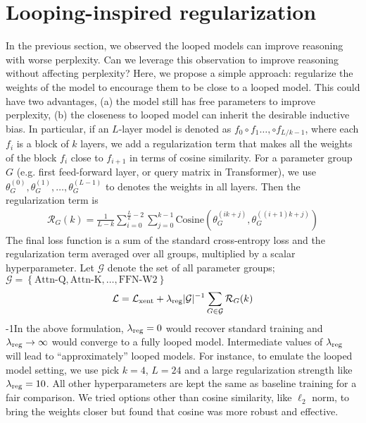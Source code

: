 \section{Looping-inspired regularization}
\label{sec:regularization}

In the previous section, we observed the looped models can improve reasoning with worse perplexity. Can we leverage this observation to improve reasoning without affecting perplexity? Here, we propose a simple approach: regularize the weights of the model to encourage them to be close to a looped model. This could have two advantages, (a) the model still has free parameters to improve perplexity, (b) the closeness to looped model can inherit the desirable inductive bias.
In particular, if an $L$-layer model is denoted as $f_{0}\circ f_{1} \dots, \circ f_{L/k-1}$, where each $f_{i}$ is a block of $k$ layers, we add a regularization term that makes all the weights of the block $f_{i}$ close to $f_{i+1}$ in terms of cosine similarity.
For a parameter group $G$ (e.g. first feed-forward layer, or query matrix in Transformer), we use $\theta_{G}^{(0)}, \theta_{G}^{(1)}, \dots, \theta_{G}^{(L-1)}$ to denotes the weights in all layers.
Then the regularization term is
\begin{align}
    \mathcal{R}_{G}(k) = \frac{1}{L-k}\sum_{i=0}^{\frac{L}{k}-2} \sum_{j=0}^{k-1} \text{Cosine}\left(\theta_{G}^{(i k + j)}, \theta_{G}^{((i+1) k + j)}\right)
\end{align}
The final loss function is a sum of the standard cross-entropy loss and the regularization term averaged over all groups, multiplied by a scalar hyperparameter. Let $\mathcal{G}$ denote the set of all parameter groups; $\mathcal{G} = \left\{\text{Attn-Q}, \text{Attn-K}, \dots, \text{FFN-W2}\right\}$
\begin{align}
    \mathcal{L} = \mathcal{L_{\text{xent}}} + \lambda_{\text{reg}}|\mathcal{G}|^{-1}  \sum_{G \in \mathcal{G}} \mathcal{R}_{G}(k)
    \label{eq:regularization}
\end{align}
\looseness-1In the above formulation, $\lambda_{\text{reg}}=0$ would recover standard training and $\lambda_{\text{reg}} \rightarrow \infty$ would converge to a fully looped model. Intermediate values of $\lambda_{\text{reg}}$ will lead to ``approximately'' looped models. For instance, to emulate the  looped model setting, we use pick $k=4$, $L=24$ and a large regularization strength like $\lambda_{\text{reg}}=10$. All other hyperparameters are kept the same as baseline training for a fair comparison. 
We tried options other than cosine similarity, like $\ell_2$ norm, to bring the weights closer but found that cosine was more robust and effective.

